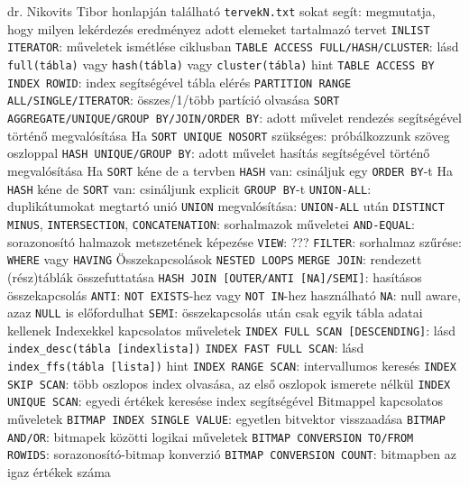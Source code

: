 \documentclass[12pt,a4paper]{article}
\begin{document}
\begin{outline}
	\1 dr. Nikovits Tibor honlapján található \texttt{tervekN.txt} sokat segít: megmutatja, hogy milyen lekérdezés eredményez adott elemeket tartalmazó tervet
	\1 \texttt{INLIST ITERATOR}: műveletek ismétlése ciklusban
	\1 \texttt{TABLE ACCESS FULL/HASH/CLUSTER}: lásd \texttt{full(tábla)} vagy \texttt{hash(tábla)} vagy \texttt{cluster(tábla)} hint
	\1 \texttt{TABLE ACCESS BY INDEX ROWID}: index segítségével tábla elérés
	\1 \texttt{PARTITION RANGE ALL/SINGLE/ITERATOR}: összes/1/több partíció olvasása
	\1 \texttt{SORT AGGREGATE/UNIQUE/GROUP BY/JOIN/ORDER BY}: adott művelet rendezés segítségével történő megvalósítása
		\2 Ha \texttt{SORT UNIQUE NOSORT} szükséges: próbálkozzunk szöveg oszloppal
	\1 \texttt{HASH UNIQUE/GROUP BY}: adott művelet hasítás segítségével történő megvalósítása
		\2 Ha \texttt{SORT} kéne de a tervben \texttt{HASH} van: csináljuk egy \texttt{ORDER BY}-t
		\2 Ha \texttt{HASH} kéne de \texttt{SORT} van: csináljunk explicit \texttt{GROUP BY}-t
	\1 \texttt{UNION-ALL}: duplikátumokat megtartó unió
		\2 \texttt{UNION} megvalósítása: \texttt{UNION-ALL} után \texttt{DISTINCT}
	\1 \texttt{MINUS}, \texttt{INTERSECTION}, \texttt{CONCATENATION}: sorhalmazok műveletei
	\1 \texttt{AND-EQUAL}: sorazonosító halmazok metszetének képezése
	\1 \texttt{VIEW}: ???
	\1 \texttt{FILTER}: sorhalmaz szűrése: \texttt{WHERE} vagy \texttt{HAVING}
	\1 Összekapcsolások
		\2 \texttt{NESTED LOOPS}
		\2 \texttt{MERGE JOIN}: rendezett (rész)táblák összefuttatása
		\2 \texttt{HASH JOIN [OUTER/ANTI [NA]/SEMI]}: hasításos összekapcsolás
			\3 \texttt{ANTI}: \texttt{NOT EXISTS}-hez vagy \texttt{NOT IN}-hez használható
			\3 \texttt{NA}: null aware, azaz \texttt{NULL} is előfordulhat
			\3 \texttt{SEMI}: összekapcsolás után csak egyik tábla adatai kellenek
	\1 Indexekkel kapcsolatos műveletek
		\2 \texttt{INDEX FULL SCAN [DESCENDING]}: lásd \texttt{index\_desc(tábla [indexlista])}
		\2 \texttt{INDEX FAST FULL SCAN}: lásd \texttt{index\_ffs(tábla [lista])} hint
		\2 \texttt{INDEX RANGE SCAN}: intervallumos keresés
		\2 \texttt{INDEX SKIP SCAN}: több oszlopos index olvasása, az első oszlopok ismerete nélkül
		\2 \texttt{INDEX UNIQUE SCAN}: egyedi értékek keresése index segítségével
	\1 Bitmappel kapcsolatos műveletek
		\2 \texttt{BITMAP INDEX SINGLE VALUE}: egyetlen bitvektor visszaadása
		\2 \texttt{BITMAP AND/OR}: bitmapek közötti logikai műveletek
		\2 \texttt{BITMAP CONVERSION TO/FROM ROWIDS}: sorazonosító-bitmap konverzió
		\2 \texttt{BITMAP CONVERSION COUNT}: bitmapben az igaz értékek száma
\end{outline}
\end{document}
